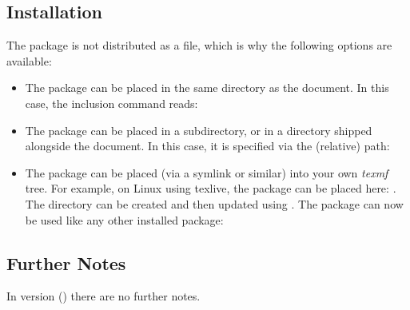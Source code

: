 \documentclass{sopra-base}
\begin{document}
\subsection{Installation}
    The package is not distributed as a  file, which is why the
    following options are available:
    \begin{itemize}
        \item The package can be placed in the same directory as the document.
                In this case, the inclusion command reads:
\begin{plainlatex}
\usepackage{sopra-tables}
\end{plainlatex}
        \item The package can be placed in a subdirectory, or in a
                directory shipped alongside the document. In
                this case, it is specified via the (relative) path:
\begin{plainlatex}
\usepackage{./My/Path/to/sopra-tables}
\end{plainlatex}
        \item The package can be placed (via a symlink or similar)
              into your own \emph{texmf} tree.
              For example, on Linux using texlive,
              the package can be placed here: .
              The directory can be created and then
              updated using . The
              package can now be used like any other installed package:
\begin{plainlatex}
\usepackage{sopra-tables}
\end{plainlatex}
    \end{itemize}

\subsection{Further Notes}
In version \thesotversion{} () there are no further
notes.

%
%
%
%
\end{document}
